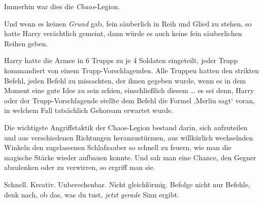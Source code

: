 Immerhin war dies die \emph{Chaos}-Legion.

Und wenn es keinen \emph{Grund} gab, fein säuberlich in Reih und Glied zu stehen, so hatte Harry verächtlich gemeint, dann würde es auch keine fein säuberlichen Reihen geben.

Harry hatte die Armee in 6 Trupps zu je 4 Soldaten eingeteilt, jeder Trupp kommandiert von einem Trupp-Vorschlagenden. Alle Truppen hatten den strikten Befehl, jeden Befehl zu missachten, der ihnen gegeben wurde, wenn es in dem Moment eine gute Idee zu sein schien, einschließlich diesem … es sei denn, Harry oder der Trupp-Vorschlagende stellte dem Befehl die Formel ‚Merlin sagt‘ voran, in welchem Fall tatsächlich Gehorsam erwartet wurde.%

Die wichtigste Angriffstaktik der Chaos-Legion bestand darin, sich aufzuteilen und aus verschiedenen Richtungen heranzustürmen, aus willkürlich wechselnden Winkeln den zugelassenen Schlafzauber so schnell zu feuern, wie man die magische Stärke wieder aufbauen konnte. Und sah man eine Chance, den Gegner abzulenken oder zu verwirren, so ergriff man sie.

Schnell. Kreativ. Unberechenbar. Nicht gleichförmig. Befolge nicht nur Befehle, denk nach, ob das, was du tust, \emph{jetzt gerade} Sinn ergibt.

